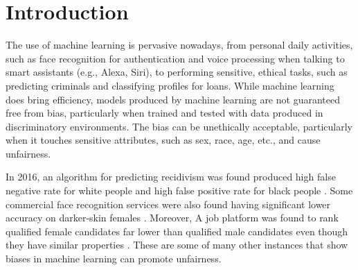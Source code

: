 \documentclass[sigconf,review]{acmart}
\begin{document}


\maketitle

\section{Introduction}
\label{sec:introduction}
The use of machine learning is pervasive nowadays, from personal daily activities, such as face recognition for authentication and voice processing when talking to smart assistants (e.g., Alexa, Siri), to performing sensitive, ethical tasks, such as predicting criminals and classifying profiles for loans. While machine learning does bring efficiency, models produced by machine learning are not guaranteed free from bias, particularly when trained and tested with data produced in discriminatory environments. The bias can be unethically acceptable, particularly when it touches sensitive attributes, such as sex, race, age, etc., and cause unfairness. 

In 2016, an algorithm for predicting recidivism was found produced high false negative rate for white people and high false positive rate for black people \cite{angwin2016machine}. Some commercial face recognition services were also found having significant lower accuracy on darker-skin females \cite{buolamwini2018gender}. Moreover, A job platform was found to rank qualified female candidates far lower than qualified male candidates even though they have similar properties \cite{lahoti2019ifair}. These are some of many other instances that show biases in machine learning can promote unfairness. 
\end{document}
